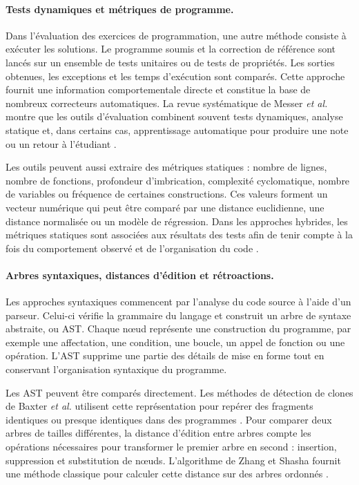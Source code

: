 \documentclass[12pt,a4paper,oneside]{report}
\begin{document}
\paragraph{Tests dynamiques et métriques de programme.}

Dans l'évaluation des exercices de programmation, une autre méthode consiste
à exécuter les solutions. Le programme soumis et la correction de référence
sont lancés sur un ensemble de tests unitaires ou de tests de propriétés.
Les sorties obtenues, les exceptions et les temps d'exécution sont comparés.
Cette approche fournit une information comportementale directe et constitue
la base de nombreux correcteurs automatiques. La revue systématique de
Messer \emph{et al.} montre que les outils d'évaluation combinent souvent
tests dynamiques, analyse statique et, dans certains cas, apprentissage
automatique pour produire une note ou un retour à l'étudiant
\cite{messer_2024}.

Les outils peuvent aussi extraire des métriques statiques : nombre de lignes,
nombre de fonctions, profondeur d'imbrication, complexité cyclomatique,
nombre de variables ou fréquence de certaines constructions. Ces valeurs
forment un vecteur numérique qui peut être comparé par une distance euclidienne,
une distance normalisée ou un modèle de régression. Dans les approches
hybrides, les métriques statiques sont associées aux résultats des tests afin
de tenir compte à la fois du comportement observé et de l'organisation du
code \cite{messer_2024,vujosevic-janicic_software_2013}.

\paragraph{Arbres syntaxiques, distances d'édition et rétroactions.}

Les approches syntaxiques commencent par l'analyse du code source à l'aide
d'un parseur. Celui-ci vérifie la grammaire du langage et construit un arbre
de syntaxe abstraite, ou AST. Chaque nœud représente une construction du
programme, par exemple une affectation, une condition, une boucle, un appel
de fonction ou une opération. L'AST supprime une partie des détails de mise
en forme tout en conservant l'organisation syntaxique du programme.

Les AST peuvent être comparés directement. Les méthodes de détection de
clones de Baxter \emph{et al.} utilisent cette représentation pour repérer
des fragments identiques ou presque identiques dans des programmes
\cite{baxter_clone_1998}. Pour comparer deux arbres de tailles différentes, la
distance d'édition entre arbres compte les opérations nécessaires pour
transformer le premier arbre en second : insertion, suppression et
substitution de nœuds. L'algorithme de Zhang et Shasha fournit une méthode
classique pour calculer cette distance sur des arbres ordonnés
\cite{zhang_simple_1989}.
\end{document}
